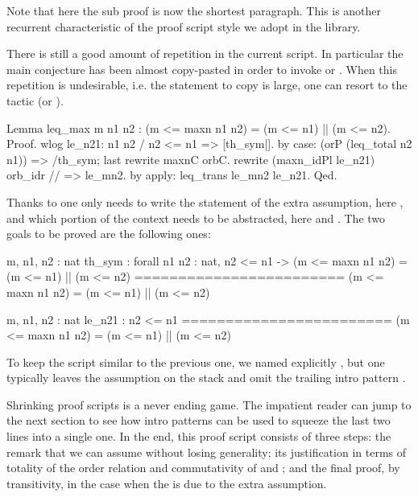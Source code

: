 Note that here the sub proof is now the shortest paragraph.
This is another recurrent characteristic of the proof script style
we adopt in the \mcbMC{} library.

There is still a good amount of repetition in the current script.
In particular the main conjecture has been almost copy-pasted in
order to invoke  or .  When this repetition
is undesirable, i.e. the statement to copy is large, one
can resort to the  tactic (or ).

\begin{coq}{}{}
Lemma leq_max m n1 n2 : (m <= maxn n1 n2) = (m <= n1) || (m <= n2).
Proof.
wlog le_n21: n1 n2 / n2 <= n1  => [th_sym|].
  by case: (orP (leq_total n2 n1)) => /th_sym; last rewrite maxnC orbC.
rewrite (maxn_idPl le_n21) orb_idr // => le_mn2.
by apply: leq_trans le_mn2 le_n21.
Qed.
\end{coq}

Thanks to  one only needs to write the statement of the extra
assumption, here , and which portion of the context needs
to be abstracted, here  and .
The two goals to be proved are the following ones:

\begin{coqout}{}{}
m, n1, n2 : nat
th_sym : forall n1 n2 : nat, n2 <= n1 ->
           (m <= maxn n1 n2) = (m <= n1) || (m <= n2)
========================
(m <= maxn n1 n2) = (m <= n1) || (m <= n2)
\end{coqout}

\begin{coqout}{}{}
m, n1, n2 : nat
le_n21 : n2 <= n1
========================
(m <= maxn n1 n2) = (m <= n1) || (m <= n2)
\end{coqout}

To keep the script similar to the previous one, we named explicitly
, but one typically leaves the assumption on the stack
and omit the trailing intro pattern \C{=> [th_sym|]}.

Shrinking proof scripts is a never ending game.  The impatient reader can
jump to the next section to see
how intro patterns can be used to squeeze the last two lines into a
single one.  In the end, this proof script consists of three steps:
the remark that we can
assume  without losing generality; its justification in
terms of totality of the order relation and commutativity of 
and \C{||}; and the final proof, by transitivity, in the case when
the  is  due to the extra assumption.

